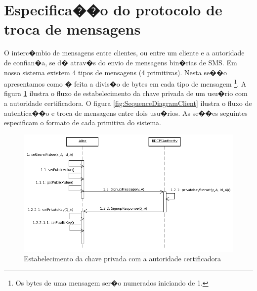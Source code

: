 \documentclass[a4paper,capchap,espacoduplo,normaltoc]{abntepusp}
\begin{document}
\section{Especifica��o do protocolo de troca de mensagens}


O interc�mbio de mensagens entre clientes, ou entre um cliente e a autoridade de confian�a, se d� atrav�s do envio de mensagens  bin�rias de SMS. Em nosso sistema existem 4 tipos de mensagens (4 primitivas). Nesta se��o apresentamos como � feita a divis�o de bytes em cada tipo de mensagem \footnote{Os bytes de uma mensagem ser�o numerados iniciando de 1.}. A figura \ref{fig:SequenceDiagramKGB} ilustra o fluxo de estabelecimento da chave privada de um usu�rio com a autoridade certificadora. O figura \ref{fig:SequenceDiagramClient} ilustra o fluxo de autentica��o e troca de mensagens entre dois usu�rios. As se��es seguintes especificam o formato de cada primitiva do sistema.

\begin{figure}[h]
	\centering		\includegraphics[width=1.00\textwidth]{figuras/SequenceDiagramKGB.png}
	\caption{Estabelecimento da chave privada com a autoridade certificadora}	
	\label{fig:SequenceDiagramKGB}
\end{figure}
\end{document}
